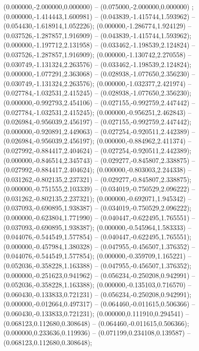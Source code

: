  (0.000000,-2.000000,0.000000) -- (0.075000,-2.000000,0.000000) ;
 (0.000000,-1.414443,1.600981) -- (0.043839,-1.415744,1.593962) -- (0.054430,-1.618914,1.052226);
 (0.000000,-1.286774,1.924129) -- (0.037526,-1.287857,1.916909) -- (0.043839,-1.415744,1.593962);
 (0.000000,-1.197712,2.131958) -- (0.033462,-1.198539,2.124824) -- (0.037526,-1.287857,1.916909);
 (0.000000,-1.130742,2.270558) -- (0.030749,-1.131324,2.263576) -- (0.033462,-1.198539,2.124824);
 (0.000000,-1.077291,2.363068) -- (0.028938,-1.077650,2.356230) -- (0.030749,-1.131324,2.263576);
 (0.000000,-1.032377,2.421974) -- (0.027784,-1.032531,2.415245) -- (0.028938,-1.077650,2.356230);
 (0.000000,-0.992793,2.454106) -- (0.027155,-0.992759,2.447442) -- (0.027784,-1.032531,2.415245);
 (0.000000,-0.956251,2.462843) -- (0.026984,-0.956039,2.456197) -- (0.027155,-0.992759,2.447442);
 (0.000000,-0.920891,2.449063) -- (0.027254,-0.920511,2.442389) -- (0.026984,-0.956039,2.456197);
 (0.000000,-0.884962,2.411374) -- (0.027992,-0.884417,2.404624) -- (0.027254,-0.920511,2.442389);
 (0.000000,-0.846514,2.345743) -- (0.029277,-0.845807,2.338875) -- (0.027992,-0.884417,2.404624);
 (0.000000,-0.803003,2.244338) -- (0.031262,-0.802135,2.237321) -- (0.029277,-0.845807,2.338875);
 (0.000000,-0.751555,2.103339) -- (0.034019,-0.750529,2.096222) -- (0.031262,-0.802135,2.237321);
 (0.000000,-0.692071,1.945342) -- (0.037093,-0.690895,1.938387) -- (0.034019,-0.750529,2.096222);
 (0.000000,-0.623804,1.771990) -- (0.040447,-0.622495,1.765551) -- (0.037093,-0.690895,1.938387);
 (0.000000,-0.545964,1.583333) -- (0.044076,-0.544549,1.577854) -- (0.040447,-0.622495,1.765551);
 (0.000000,-0.457984,1.380328) -- (0.047955,-0.456507,1.376352) -- (0.044076,-0.544549,1.577854);
 (0.000000,-0.359709,1.165221) -- (0.052036,-0.358228,1.163388) -- (0.047955,-0.456507,1.376352);
 (0.000000,-0.251623,0.941962) -- (0.056234,-0.250208,0.942991) -- (0.052036,-0.358228,1.163388);
 (0.000000,-0.135103,0.716570) -- (0.060430,-0.133833,0.721231) -- (0.056234,-0.250208,0.942991);
 (0.000000,-0.012664,0.497317) -- (0.064460,-0.011615,0.506366) -- (0.060430,-0.133833,0.721231);
 (0.000000,0.111910,0.294541) -- (0.068123,0.112680,0.308648) -- (0.064460,-0.011615,0.506366);
 (0.000000,0.233636,0.119936) -- (0.071199,0.234108,0.139587) -- (0.068123,0.112680,0.308648);
